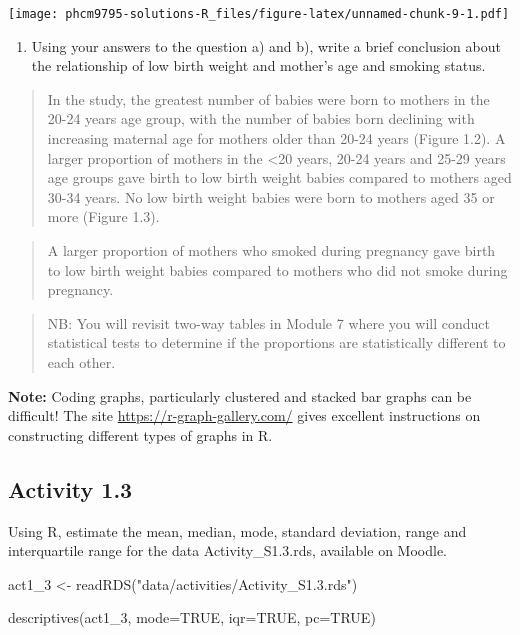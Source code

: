 \documentclass[
]{memoir}
\newenvironment{Shaded}{\begin{snugshade}}{\end{snugshade}}
\newcommand{\AttributeTok}[1]{\textcolor[rgb]{0.77,0.63,0.00}{#1}}
\newcommand{\ConstantTok}[1]{\textcolor[rgb]{0.00,0.00,0.00}{#1}}
\newcommand{\FunctionTok}[1]{\textcolor[rgb]{0.00,0.00,0.00}{#1}}
\newcommand{\NormalTok}[1]{#1}
\newcommand{\OtherTok}[1]{\textcolor[rgb]{0.56,0.35,0.01}{#1}}
\newcommand{\StringTok}[1]{\textcolor[rgb]{0.31,0.60,0.02}{#1}}
\providecommand{\tightlist}{%
  \setlength{\itemsep}{0pt}\setlength{\parskip}{0pt}}
\begin{document}
\texttt{[image: phcm9795-solutions-R\_files/figure-latex/unnamed-chunk-9-1.pdf]}

\begin{enumerate}
\def\labelenumi{\alph{enumi})}
\setcounter{enumi}{3}
\tightlist
\item
  Using your answers to the question a) and b), write a brief conclusion about the relationship of low birth weight and mother's age and smoking status.
\end{enumerate}

\begin{quote}
In the study, the greatest number of babies were born to mothers in the 20-24 years age group, with the number of babies born declining with increasing maternal age for mothers older than 20-24 years (Figure 1.2). A larger proportion of mothers in the \textless20 years, 20-24 years and 25-29 years age groups gave birth to low birth weight babies compared to mothers aged 30-34 years. No low birth weight babies were born to mothers aged 35 or more (Figure 1.3).
\end{quote}

\begin{quote}
A larger proportion of mothers who smoked during pregnancy gave birth to low birth weight babies compared to mothers who did not smoke during pregnancy.
\end{quote}

\begin{quote}
NB: You will revisit two-way tables in Module 7 where you will conduct statistical tests to determine if the proportions are statistically different to each other.
\end{quote}

\textbf{Note: } Coding graphs, particularly clustered and stacked bar graphs can be difficult! The site \url{https://r-graph-gallery.com/} gives excellent instructions on constructing different types of graphs in R.

\hypertarget{activity-1.3}{%
\subsection*{Activity 1.3}\label{activity-1.3}}

Using R, estimate the mean, median, mode, standard deviation, range and interquartile range for the data Activity\_S1.3.rds, available on Moodle.

\begin{Shaded}
\begin{Highlighting}[]
\NormalTok{act1\_3 }\OtherTok{\textless{}{-}} \FunctionTok{readRDS}\NormalTok{(}\StringTok{"data/activities/Activity\_S1.3.rds"}\NormalTok{)}

\FunctionTok{descriptives}\NormalTok{(act1\_3, }\AttributeTok{mode=}\ConstantTok{TRUE}\NormalTok{, }\AttributeTok{iqr=}\ConstantTok{TRUE}\NormalTok{, }\AttributeTok{pc=}\ConstantTok{TRUE}\NormalTok{)}
\end{Highlighting}
\end{Shaded}
\end{document}
